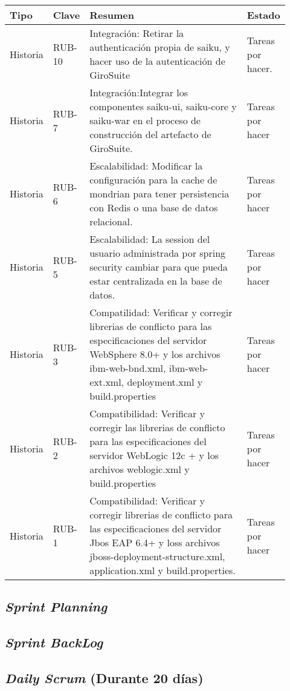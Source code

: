 \begin{spacing}{1.5}
	\begin{table}[H]\centering\small
	\begin{tabular}[t]{m{0.1\linewidth}m{0.1\linewidth}|m{0.6\linewidth} m{0.12\linewidth}}
			\hline
			\rowcolor[HTML]{CBCEFB} 
			\textbf{Tipo} & \textbf{Clave} &\textbf{Resumen} &\textbf{Estado}\\
			\hline
			Historia &RUB-10 &Integración: Retirar la authenticación propia de saiku, y hacer uso de la autenticación de GiroSuite &Tareas por hacer.\\
			\hline
			Historia &RUB-7 &Integración:Integrar los componentes saiku-ui, saiku-core y saiku-war en el proceso de construcción del artefacto de GiroSuite. &Tareas por hacer\\
			\hline
			Historia &RUB-6 &Escalabilidad: Modificar la configuración para la cache de mondrian para tener persistencia con Redis o una base de datos relacional. &Tareas por hacer\\
			\hline
			Historia &RUB-5 &Escalabilidad: La session del usuario administrada por spring security cambiar para que pueda estar centralizada en la base de datos. &Tareas por hacer\\
			\hline
			Historia &RUB-3 &Compatilidad: Verificar y corregir librerias de conflicto para las especificaciones del servidor WebSphere 8.0+ y los archivos ibm-web-bnd.xml, ibm-web-ext.xml, deployment.xml y build.properties &Tareas por hacer\\
			\hline
			Historia &RUB-2 &Compatibilidad: Verificar y corregir las librerias de conflicto para las especificaciones del servidor WebLogic 12c + y los archivos weblogic.xml y build.properties &Tareas por hacer\\
			\hline
			Historia &RUB-1 &Compatibilidad: Verificar y corregir librerias de conflicto para las especificaciones del servidor Jbos EAP 6.4+ y loss archivos jboss-deployment-structure.xml, application.xml y build.properties. &Tareas por hacer\\
			\hline
		\end{tabular}
	\end{table}

	\subsection{\textit{Sprint Planning}}
	\subsection{\textit{Sprint BackLog}}
	\subsection{\textit{Daily Scrum} (Durante 20 d\'{i}as)}

\end{spacing}
